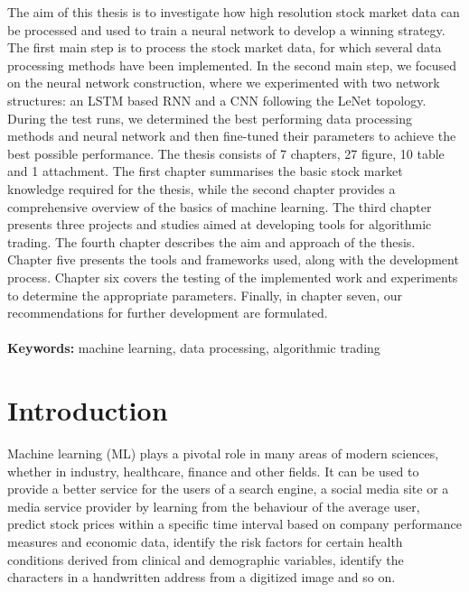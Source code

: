 \documentclass[a4paper,oneside,onecolumn,12pt]{book}
\begin{document}
\thispagestyle{empty}
The aim of this thesis is to investigate how high resolution stock market data can be processed and used to train a neural network to develop a winning strategy. The first main step is to process the stock market data, for which several data processing methods have been implemented. In the second main step, we focused on the neural network construction, where we experimented with two network structures: an LSTM based RNN and a CNN following the LeNet topology. During the test runs, we determined the best performing data processing methods and neural network and then fine-tuned their parameters to achieve the best possible performance. The thesis consists of 7 chapters, 27 figure, 10 table and 1 attachment. The first chapter summarises the basic stock market knowledge required for the thesis, while the second chapter provides a comprehensive overview of the basics of machine learning. The third chapter presents three projects and studies aimed at developing tools for algorithmic trading. The fourth chapter describes the aim and approach of the thesis. Chapter five presents the tools and frameworks used, along with the development process. Chapter six covers the testing of the implemented work and experiments to determine the appropriate parameters. Finally, in chapter seven, our recommendations for further development are formulated.
\\\\
\textbf{Keywords:} machine learning, data processing, algorithmic trading
\pagebreak

\tableofcontents
\thispagestyle{empty}

\listoffigures
\thispagestyle{empty}


\section*{Introduction}
Machine learning (ML) plays a pivotal role in many areas of modern sciences, whether in industry, healthcare, finance and other fields. It can be used to provide a better service for the users of a search engine, a social media site or a media service provider by learning from the behaviour of the average user, predict stock prices within a specific time interval based on company performance measures and economic data, identify the risk factors for certain health conditions derived from clinical and demographic variables, identify the characters in a handwritten address from a digitized image and so on. \cite{TESL}
\end{document}
